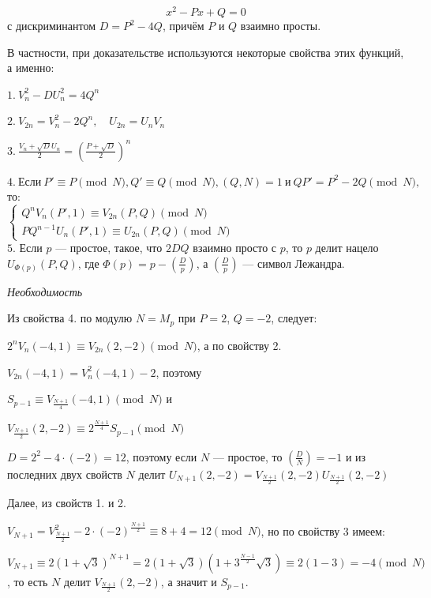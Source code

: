 \documentclass[bachelor, och, labwork]{shiza}
\begin{document}
$$x^{2}-Px+Q=0$$
с дискриминантом $D=P^{2}-4Q$, причём $P$ и $Q$ взаимно просты.

В частности, при доказательстве используются некоторые свойства этих функций, а 
именно:

$1.~ V_{n}^{2}-DU_{n}^{2}=4Q^{n}$

$2.~ V_{2n}=V_{n}^{2}-2Q^{n},\quad U_{2n}=U_{n}V_{n}$

$3.~ {\frac {V_{n}+{\sqrt {D}}U_{n}}{2}}=\left({\frac {P+{\sqrt {D}}}{2}}\right)^{n}$

$4.~ \text{Если}~ P'\equiv P{\pmod {N}}, Q'\equiv Q{\pmod {N}}, (Q,N)=1 ~\text{и}~ QP'=P^{2}-2Q{\pmod {N}},$ то:\\

 ${\begin{cases}Q^{n}V_{n}(P',1)\equiv V_{2n}(P,Q){\pmod {N}}\\PQ^{n-1}U_{n}(P',1)\equiv U_{2n}(P,Q){\pmod {N}}\end{cases}}$\\

$5.$  Если $p$ --- простое, такое, что $2DQ$ взаимно просто с $p$, то $p$ делит нацело 
$U_{\Phi (p)}(P,Q)$, где $\Phi (p)=p-\left({\frac {D}{p}}\right)$, а $\left({\frac {D}{p}}\right)$ --- 
символ Лежандра.

\begin{center}
    \textit{Необходимость}
\end{center}

Из свойства 4. по модулю $N=M_{p}$ при $P=2$, $Q=-2$, следует:

$2^{n}V_{n}(-4,1)\equiv V_{2n}(2,-2){\pmod {N}}$,
а по свойству 2.

$V_{2n}(-4,1)=V_{n}^{2}(-4,1)-2$,
поэтому

$S_{p-1}\equiv V_{\frac {N+1}{4}}(-4,1){\pmod {N}}$
и

$V_{\frac {N+1}{2}}(2,-2)\equiv 2^{\frac {N+1}{4}}S_{p-1}{\pmod {N}}$

$D=2^{2}-4\cdot (-2)=12$, поэтому если $N$ --- простое, то 
$\left({\frac {D}{N}}\right)=-1$ и из последних двух свойств $N$ делит
$U_{N+1}(2,-2)=V_{\frac {N+1}{2}}(2,-2)U_{\frac {N+1}{2}}(2,-2)$

Далее, из свойств 1. и 2.

$V_{N+1}=V_{\frac {N+1}{2}}^{2}-2\cdot (-2)^{\frac {N+1}{2}}\equiv 8+4=12{\pmod {N}}$,
но по свойству 3 имеем:

$V_{N+1}\equiv 2(1+{\sqrt {3}})^{N+1}=2(1+{\sqrt {3}})(1+3^{\frac {N-1}{2}}{\sqrt {3}})\equiv 2(1-3)=-4{\pmod {N}}$,
то есть $N$ делит $V_{\frac {N+1}{2}}(2,-2)$, а значит и $S_{p-1}$.
\end{document}
